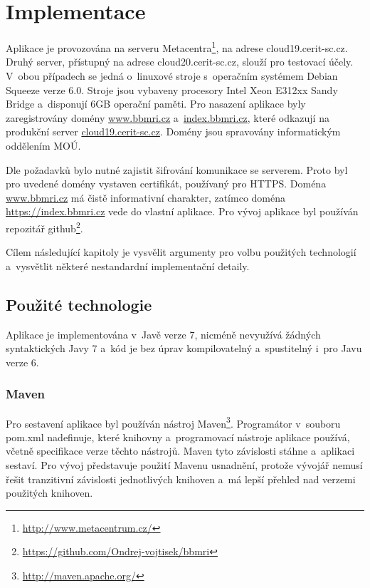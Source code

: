 \documentclass[11pt, final, oneside]{fithesis2}
\begin{document}
\chapter{Implementace}\label{chapter:implementation}
Aplikace je provozována na serveru Metacentra\footnote{\url{http://www.metacentrum.cz/}}, na adrese cloud19.cerit-sc.cz. Druhý server, přístupný na adrese cloud20.cerit-sc.cz, slouží pro testovací účely. V~obou případech se jedná o~linuxové stroje s~operačním systémem Debian Squeeze verze 6.0. Stroje jsou vybaveny procesory Intel Xeon E312xx Sandy Bridge a~disponují 6GB operační paměti. Pro nasazení aplikace byly zaregistrovány domény \url{www.bbmri.cz} a~\url{index.bbmri.cz}, které odkazují na produkční server \url{cloud19.cerit-sc.cz}. Domény jsou spravovány informatickým oddělením MOÚ.

Dle požadavků bylo nutné zajistit šifrování komunikace se serverem. Proto byl pro uvedené domény vystaven certifikát, používaný pro HTTPS. 
Doména \url{www.bbmri.cz} má čistě informativní charakter, zatímco doména \url{https://index.bbmri.cz} vede do vlastní aplikace.
Pro vývoj aplikace byl používán repozitář github\footnote{\url{https://github.com/Ondrej-vojtisek/bbmri}}. 

Cílem následující kapitoly je vysvělit argumenty pro volbu použitých technologií a~vysvětlit některé nestandardní implementační detaily.

\section{Použité technologie}
Aplikace je implementována v~Javě verze 7, nicméně nevyužívá žádných syntaktických  Javy 7 a~kód je bez úprav kompilovatelný a~spustitelný i~pro Javu verze 6. 

\subsection{Maven}
Pro sestavení aplikace byl používán nástroj Maven\footnote{\url{http://maven.apache.org/}}. Programátor v~souboru pom.xml nadefinuje, které knihovny a~programovací nástroje aplikace používá, včetně specifikace verze těchto nástrojů. Maven tyto závislosti stáhne a~aplikaci sestaví. Pro vývoj představuje použití Mavenu usnadnění, protože vývojář nemusí řešit tranzitivní závislosti jednotlivých knihoven a~má lepší přehled nad verzemi použitých knihoven. 
\end{document}
